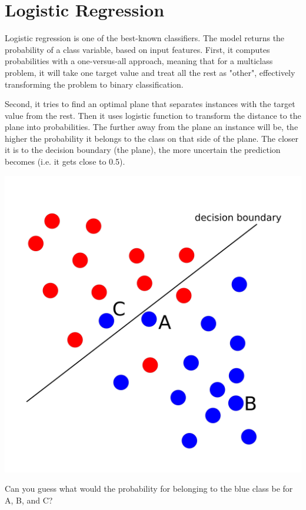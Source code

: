 \chapter{Logistic Regression}
\label{ch:logistic_regression}

Logistic regression is one of the best-known classifiers. The model returns the probability of a class variable, based on input features. First, it computes probabilities with a one-versus-all approach, meaning that for a multiclass problem, it will take one target value and treat all the rest as "other", effectively transforming the problem to binary classification.

Second, it tries to find an optimal plane that separates instances with the target value from the rest. Then it uses logistic function to transform the distance to the plane into probabilities. The further away from the plane an instance will be, the higher the probability it belongs to the class on that side of the plane. The closer it is to the decision boundary (the plane), the more uncertain the prediction becomes (i.e. it gets close to 0.5).

\begin{marginfigure}
    \includegraphics[width=\textwidth]{logistic-regression.png}%
    \caption{Can you guess what would the probability for belonging to the blue class be for A, B, and C?}
    \label{fig:logreg}
  \end{marginfigure}

